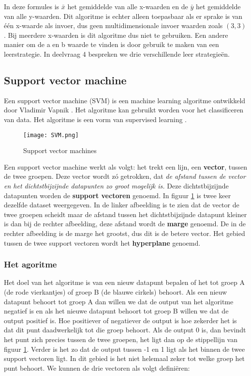 In deze formules is $\bar{x}$ het gemiddelde van alle x-waarden en de $\bar{y}$ het gemiddelde van alle y-waarden. 
Dit algoritme is echter alleen toepasbaar als er sprake is van \'{e}\'{e}n x-waarde als invoer, dus geen multidimensionale invoer waarden zoals $(3,3)$. Bij meerdere x-waarden is dit algoritme dus niet te gebruiken. Een andere manier om de a en b waarde te vinden is door gebruik te maken van een leerstrategie. In deelvraag 4 bespreken we drie verschillende leer strategieën.

\subsection{Support vector machine}
Een support vector machine (SVM) is een machine learning algoritme ontwikkeld door Vladimir Vapnik \cite{VladimirVapnik}. Het algoritme kan gebruikt worden voor het classificeren van data. Het algoritme is een vorm van supervised learning \cite{SVM}.

\begin{figure}[h]
  \centering
    \texttt{[image: SVM.png]}
  \caption{Support vector machines}
  \label{fig:SupVectorMachine1}
\end{figure}

Een support vector machine werkt als volgt: het trekt een lijn, een \textbf{vector}, tussen de twee groepen. Deze vector wordt z\'o getrokken, dat \textit{de afstand tussen de vector en het dichtstbijzijnde datapunten zo groot mogelijk is.} \cite{SVM2} Deze dichtstbijzijnde datapunten worden de \textbf{support vectoren} genoemd. In figuur \ref{fig:SupVectorMachine1} is twee keer dezelfde dataset weergegeven. In de linker afbeelding is te zien dat de vector de twee groepen scheidt maar de afstand tussen het dichtstbijzijnde datapunt kleiner is dan bij de rechter afbeelding, deze afstand wordt de \textbf{marge} genoemd. De in de rechter afbeelding is de marge het grootst, dus dit is de betere vector. Het gebied tussen de twee support vectoren wordt het \textbf{hyperplane} genoemd.

\subsubsection{Het agoritme}
Het doel van het algoritme is van een nieuw datapunt bepalen of het tot groep A (de rode vierkantjes) of groep B (de blauwe cirkels) behoort. Als een nieuw datapunt behoort tot groep A dan willen we dat de output van het algoritme negatief is en als het nieuwe datapunt behoort tot groep B willen we dat de output positief is. Hoe positiever of negatiever de output is hoe zekerder het is dat dit punt daadwerkelijk tot die groep behoort. Als de output 0 is, dan bevindt het punt zich precies tussen de twee groepen, het ligt dan op de stippellijn van figuur \ref{fig:SupVectorMachine1}. Verder is het zo dat de output tussen -1 en 1 ligt als het binnen de twee support vectoren ligt. In dit gebied is het niet helemaal zeker tot welke groep het punt behoort. 
We kunnen de drie vectoren als volgt definiëren: 

